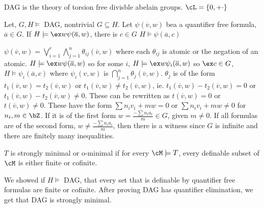 \noindent
DAG is the theory of torsion free divisble abelain groups. $\cL = \{0, + \cdot\}$ 

\begin{lemma}
    Let, $G, H \models$ DAG, nontrivial $G \subseteq H$. Let $\psi(\overline{v}, w)$ bea a quantifier free formula, $\overline{a} \in G$. If $H \models \ex w \psi(\overline{a},w)$, there is $c \in G$ $H \models \psi(\overline{a},c)$ 
\end{lemma}

\begin{pf}
    $\psi(\overline{v}, w) = \bigvee_{i=1}^r \bigwedge_{j=1}^n \theta_{ij}(\overline{v}, w)$ where each $\theta_{ij}$ is atomic or the negation of an atomic. $H \models \ex w \psi(\overline{a},w)$ so for some $i$, $H \models \ex w \psi_i(\overline{a},w)$ so $\ex c \in G$, $H \models \psi_i(\overline{a},c)$ where $\psi_i(v,w)$ is $\bigcap_{j=1}^n \theta_j(\overline{v}, w)$. $\theta_j$ is of the form $t_1(\overline{v},w) = t_2(\overline{v},w)$ or $t_1(\overline{v},w) \neq t_2(\overline{v},w)$, ie. $t_1(\overline{v},w) - t_2(\overline{v},w)=0$ or $t_1(\overline{v},w)-  t_2(\overline{v},w)\neq 0$. These can be rewritten as $t(\overline{v},w) = 0$ or $t(\overline{v},w) \neq 0$. These have the form $\sum n_iv_i + mw=0$ or $\sum n_iv_i + mw \neq 0$ for $n_i, m \in \bZ$. If it is of the first form $w = \frac{- \sum n_ia_i}{m} \in G$, given $m \neq 0$. If all formulas are of the second form, $w \neq  \frac{- \sum n_ia_i}{m}$, then there is a witness since $G$ is infinite and there are finitely many inequalities. 
\end{pf}

\begin{definition}
    $T$ is strongly minimal or o-minimal if for every $\cM \models T$, every definable subset of $\cM$ is either finite or cofinite. 
\end{definition}

\noindent
We showed if $H \models$ DAG, that every set that is definable by quantifier free formulas are finite or cofinite. After proving DAG has quantifier elimination, we get that DAG is strongly minimal. 